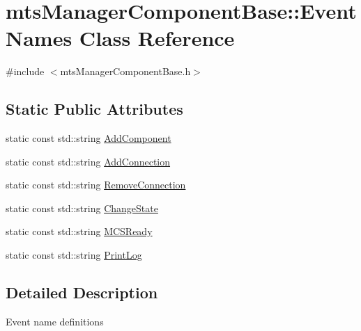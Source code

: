 \hypertarget{classmts_manager_component_base_1_1_event_names}{\section{mts\-Manager\-Component\-Base\-:\-:Event\-Names Class Reference}
\label{classmts_manager_component_base_1_1_event_names}
}


{\ttfamily \#include $<$mts\-Manager\-Component\-Base.\-h$>$}

\subsection*{Static Public Attributes}
\begin{DoxyCompactItemize}
\item 
static const std\-::string \hyperlink{classmts_manager_component_base_1_1_event_names_affb24ff1ae3411f030019c2d8825ebb7}{Add\-Component}
\item 
static const std\-::string \hyperlink{classmts_manager_component_base_1_1_event_names_a58c86c23090fa30b77a4f1c021dfbdef}{Add\-Connection}
\item 
static const std\-::string \hyperlink{classmts_manager_component_base_1_1_event_names_a6ed5a8983b5fcaf54f4325330c05d42e}{Remove\-Connection}
\item 
static const std\-::string \hyperlink{classmts_manager_component_base_1_1_event_names_af360509da7183c9e77c4bf6c6cda9b2b}{Change\-State}
\item 
static const std\-::string \hyperlink{classmts_manager_component_base_1_1_event_names_a355cdd3ebdf92a00a01aca1ded79604f}{M\-C\-S\-Ready}
\item 
static const std\-::string \hyperlink{classmts_manager_component_base_1_1_event_names_aba75227480c71f9c9f841514b8799534}{Print\-Log}
\end{DoxyCompactItemize}


\subsection{Detailed Description}
Event name definitions 


